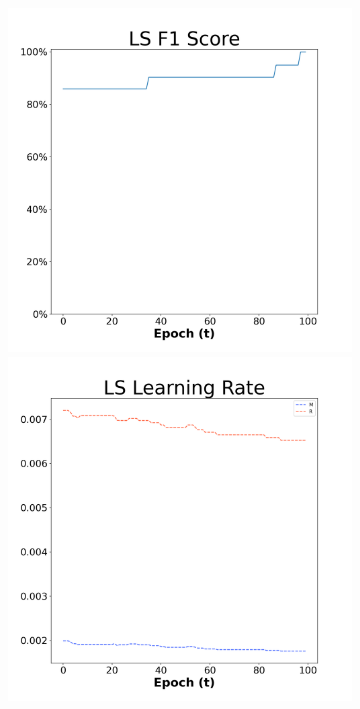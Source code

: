 \begin{figure}[H]
    \centering %
\begin{subfigure}{0.3\textwidth}
  \includegraphics[width=\linewidth]{images/exper2/Sonar/LS_0.01_f1.png}
    \includegraphics[width=\linewidth]{images/exper2/Sonar/LS_0.01_lr.png}

\end{subfigure}
\end{figure}
